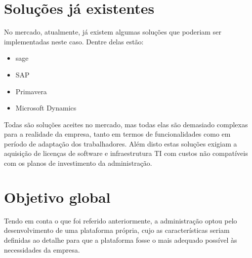 \section{Soluções já existentes}
No mercado, atualmente, já existem algumas soluções que poderiam ser implementadas neste caso. Dentre delas estão:

\begin{itemize}
    \item sage
    \item SAP
    \item Primavera
    \item Microsoft Dynamics
\end{itemize}

Todas são soluções aceites no mercado, mas todas elas são demasiado complexas para a realidade da empresa, tanto em termos de funcionalidades como em período de adaptação dos trabalhadores.
Além disto estas soluções exigiam a aquisição de licenças de software e infraestrutura TI\label{sym:TI} com custos não compatíveis com os planos de investimento da administração.

\section{Objetivo global}
Tendo em conta o que foi referido anteriormente, a administração optou pelo desenvolvimento de uma plataforma própria, cujo as características seriam definidas ao detalhe para que a plataforma fosse o mais adequado possível às necessidades da empresa.